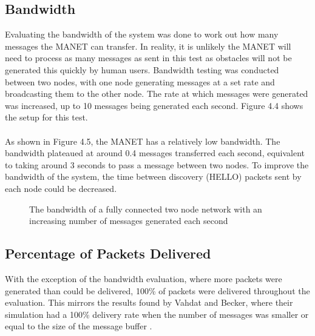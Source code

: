 \documentclass[12pt,a4paper]{report}
\makeatletter
\newenvironment{figurehere}
  {\def\@captype{figure}}
  {}
\makeatother
\begin{document}
\subsection{Bandwidth}
Evaluating the bandwidth of the system was done to work out how many messages the MANET can transfer. In reality, it is unlikely the MANET will need to process as many messages as sent in this test as obstacles will not be generated this quickly by human users. Bandwidth testing was conducted between two nodes, with one node generating messages at a set rate and broadcasting them to the other node. The rate at which messages were generated was increased, up to 10 messages being generated each second. Figure 4.4 shows the setup for this test. \\ \\
As shown in Figure 4.5, the MANET has a relatively low bandwidth. The bandwidth plateaued at around 0.4 messages transferred each second, equivalent to taking around 3 seconds to pass a message between two nodes. To improve the bandwidth of the system, the time between discovery (HELLO) packets sent by each node could be decreased. 
\begin{figurehere}
\begin{center}
\end{center}
\caption{The network used for bandwidth testing}
\end{figurehere}
\begin{figure}[h]
\begin{center}

\end{center}
\caption{The bandwidth of a fully connected two node network with an increasing number of messages generated each second}
\end{figure}

\subsection{Percentage of Packets Delivered}
With the exception of the bandwidth evaluation, where more packets were generated than could be delivered, 100\% of packets were delivered throughout the evaluation. This mirrors the results found by Vahdat and Becker, where their simulation had a 100\% delivery rate when the number of messages was smaller or equal to the size of the message buffer \cite{epidemic}.\\
\end{document}
